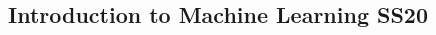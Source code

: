 \documentclass[11pt,landscape,a4paper]{extarticle}
\begin{document}
\begin{multicols*}{4}

\section*{Introduction to Machine Learning SS20}
















\end{multicols*}
\end{document}

